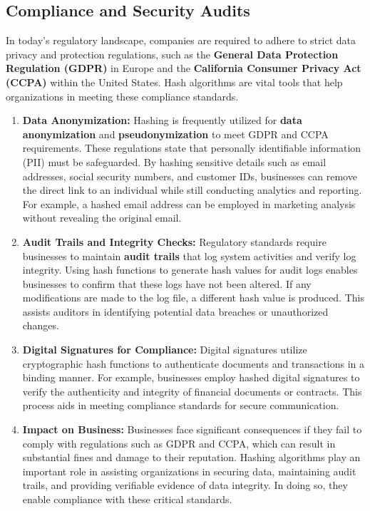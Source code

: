 \documentclass[11pt,a4paper]{article}
\begin{document}
    \subsection*{Compliance and Security Audits}
    In today’s regulatory landscape, companies are required to adhere to strict data privacy and protection regulations, such as the \textbf{General Data Protection Regulation (GDPR)} in Europe and the \textbf{California Consumer Privacy Act (CCPA)} within the United States. Hash algorithms are vital tools that help organizations in meeting these compliance standards.
        \begin{enumerate}
            \item \textbf{Data Anonymization:}
            \newline
            Hashing is frequently utilized for \textbf{data anonymization} and \textbf{pseudonymization} to meet GDPR and CCPA requirements. These regulations state that personally identifiable information (PII) must be safeguarded. By hashing sensitive details such as email addresses, social security numbers, and customer IDs, businesses can remove the direct link to an individual while still conducting analytics and reporting. For example, a hashed email address can be employed in marketing analysis without revealing the original email.

            \item \textbf{Audit Trails and Integrity Checks:}
            \newline
            Regulatory standards require businesses to maintain \textbf{audit trails} that log system activities and verify log integrity. Using hash functions to generate hash values for audit logs enables businesses to confirm that these logs have not been altered. If any modifications are made to the log file, a different hash value is produced. This assists auditors in identifying potential data breaches or unauthorized changes.

            \item \textbf{Digital Signatures for Compliance:}
            \newline
            Digital signatures utilize cryptographic hash functions to authenticate documents and transactions in a binding manner. For example, businesses employ hashed digital signatures to verify the authenticity and integrity of financial documents or contracts. This process aids in meeting compliance standards for secure communication.

            \item \textbf{Impact on Business:}
            \newline
            Businesses face significant consequences if they fail to comply with regulations such as GDPR and CCPA, which can result in substantial fines and damage to their reputation. Hashing algorithms play an important role in assisting organizations in securing data, maintaining audit trails, and providing verifiable evidence of data integrity. In doing so, they enable compliance with these critical standards.

        \end{enumerate}
\end{document}
